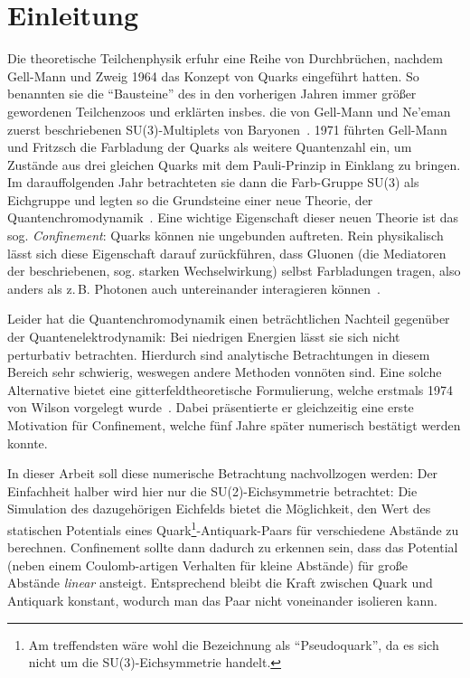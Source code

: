 
\chapter{Einleitung}
\label{sec:einleitung}

Die theoretische Teilchenphysik erfuhr eine Reihe von Durchbrüchen, nachdem
Gell-Mann und Zweig 1964 das Konzept von Quarks eingeführt hatten. So benannten
sie die \enquote{Bausteine} des in den vorherigen Jahren immer größer gewordenen
Teilchenzoos und erklärten insbes. die von Gell-Mann und Ne'eman zuerst beschriebenen
SU(3)-Multiplets von Baryonen~\cite{historyOfQCD}. 1971 führten Gell-Mann und Fritzsch
die Farbladung der Quarks als weitere Quantenzahl ein, um Zustände aus drei
gleichen Quarks mit dem Pauli-Prinzip in Einklang zu bringen. Im darauffolgenden
Jahr betrachteten sie dann die Farb-Gruppe SU(3) als Eichgruppe und legten so
die Grundsteine einer neue Theorie, der Quantenchromodynamik~\cite{historyOfQCD}.
Eine wichtige Eigenschaft dieser neuen Theorie ist das sog. \emph{Confinement}:
Quarks können nie ungebunden auftreten. Rein physikalisch lässt
sich diese Eigenschaft darauf zurückführen, dass Gluonen (die Mediatoren der 
beschriebenen, sog. starken Wechselwirkung) selbst Farbladungen tragen, also anders
als z.\,B. Photonen auch untereinander interagieren können~\cite{latticeQCDhistory}.

Leider hat die Quantenchromodynamik einen beträchtlichen Nachteil gegenüber
der Quantenelektrodynamik: Bei niedrigen Energien lässt sie sich nicht perturbativ
betrachten. Hierdurch sind analytische Betrachtungen in diesem Bereich sehr schwierig,
weswegen andere Methoden vonnöten sind. Eine solche Alternative bietet eine
gitterfeldtheoretische Formulierung, welche erstmals 1974 von Wilson vorgelegt
wurde~\cite{latticeQCDhistory}. Dabei präsentierte er gleichzeitig eine erste
Motivation für Confinement, welche fünf Jahre später numerisch bestätigt werden konnte.

In dieser Arbeit soll diese numerische Betrachtung nachvollzogen
werden: Der Einfachheit halber wird hier nur die SU(2)-Eichsymmetrie betrachtet:
Die Simulation des dazugehörigen Eichfelds bietet die Möglichkeit, den Wert des
statischen Potentials eines Quark\footnote{Am treffendsten wäre wohl die Bezeichnung
als \enquote{Pseudoquark}, da es sich nicht um die SU(3)-Eichsymmetrie
handelt.}-Antiquark-Paars für
verschiedene Abstände zu berechnen. Confinement sollte dann dadurch zu erkennen
sein, dass das Potential (neben einem Coulomb-artigen Verhalten für kleine Abstände)
für große Abstände \emph{linear} ansteigt. Entsprechend bleibt die Kraft zwischen
Quark und Antiquark konstant, wodurch man das Paar nicht voneinander isolieren kann.

